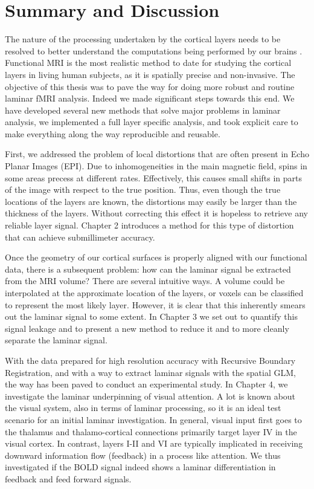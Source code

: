 
\chapter{Summary and Discussion}
\label{ch:discussion}

The nature of the processing undertaken by the cortical layers needs to be resolved to better understand the computations being performed by our brains \cite{Miller2001}. Functional MRI is the most realistic method to date for studying the cortical layers in living human subjects, as it is spatially precise and non-invasive. The objective of this thesis was to pave the way for doing more robust and routine laminar fMRI analysis. Indeed we made significant steps towards this end. We have developed several new methods that solve major problems in laminar analysis, we implemented a full layer specific analysis, and took explicit care to make everything along the way reproducible and reusable.

First, we addressed the problem of local distortions that are often present in Echo Planar Images (EPI). Due to inhomogeneities in the main magnetic field, spins in some areas precess at different rates. Effectively, this causes small shifts in parts of the image with respect to the true position. Thus, even though the true locations of the layers are known, the distortions may easily be larger than the thickness of the layers. Without correcting this effect it is hopeless to retrieve any reliable layer signal. Chapter 2 introduces a method for this type of distortion that can achieve submillimeter accuracy.

Once the geometry of our cortical surfaces is properly aligned with our functional data, there is a subsequent problem: how can the laminar signal be extracted from the MRI volume? There are several intuitive ways. A volume could be interpolated at the approximate location of the layers, or voxels can be classified to represent the most likely layer. However, it is clear that this inherently smears out the laminar signal to some extent. In Chapter 3 we set out to quantify this signal leakage and to present a new method to reduce it and to more cleanly separate the laminar signal.

With the data prepared for high resolution accuracy with Recursive Boundary Registration, and with a way to extract laminar signals with the spatial GLM, the way has been paved to conduct an experimental study. In Chapter 4, we investigate the laminar underpinning of visual attention. A lot is known about the visual system, also in terms of laminar processing, so it is an ideal test scenario for an initial laminar investigation. In general, visual input first goes to the thalamus and thalamo-cortical connections primarily target layer IV in the visual cortex. In contrast, layers I-II and VI are typically implicated in receiving downward information flow (feedback) in a process like attention. We thus investigated if the BOLD signal indeed shows a laminar differentiation in feedback and feed forward signals.

